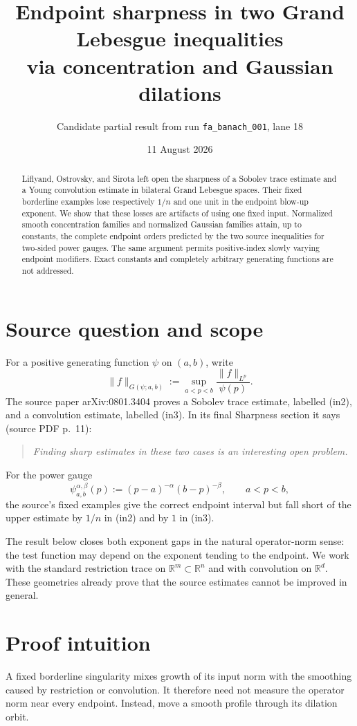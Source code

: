 \documentclass[11pt]{article}
\title{Endpoint sharpness in two Grand Lebesgue inequalities\\
via concentration and Gaussian dilations}
\author{Candidate partial result from run \texttt{fa\_banach\_001}, lane 18}
\date{11 August 2026}
\newcommand{\R}{\mathbb R}
\newcommand{\norm}[1]{\lVert#1\rVert}
\begin{document}
\maketitle
\begin{abstract}
Liflyand, Ostrovsky, and Sirota left open the sharpness of a Sobolev
trace estimate and a Young convolution estimate in bilateral Grand Lebesgue
spaces. Their fixed borderline examples lose respectively $1/n$ and one unit
in the endpoint blow-up exponent. We show that these losses are artifacts of
using one fixed input. Normalized smooth concentration families and normalized
Gaussian families attain, up to constants, the complete endpoint orders
predicted by the two source inequalities for two-sided power gauges. The same
argument permits positive-index slowly varying endpoint modifiers. Exact
constants and completely arbitrary generating functions are not addressed.
\end{abstract}

\section{Source question and scope}
For a positive generating function $\psi$ on $(a,b)$, write
\[
 \norm{f}_{G(\psi;a,b)}
 :=\sup_{a<p<b}\frac{\norm{f}_{L^p}}{\psi(p)}.
\]
The source paper arXiv:0801.3404 proves a Sobolev trace estimate, labelled
(in2), and a convolution estimate, labelled (in3). In its final Sharpness
section it says (source PDF p.~11):
\begin{quote}
\emph{Finding sharp estimates in these two cases is an interesting open problem.}
\end{quote}
For the power gauge
\[
 \psi_{a,b}^{\alpha,\beta}(p)
 :=(p-a)^{-\alpha}(b-p)^{-\beta},\qquad a<p<b,
 \tag{1}
\]
the source's fixed examples give the correct endpoint interval but fall short
of the upper estimate by $1/n$ in (in2) and by $1$ in (in3).

The result below closes both exponent gaps in the natural operator-norm sense:
the test function may depend on the exponent tending to the endpoint. We work
with the standard restriction trace on $\R^m\subset\R^n$ and with convolution
on $\R^d$. These geometries already prove that the source estimates cannot be
improved in general.

\section{Proof intuition}
A fixed borderline singularity mixes growth of its input norm with the
smoothing caused by restriction or convolution. It therefore need not measure
the operator norm near every endpoint. Instead, move a smooth profile through
its dilation orbit.
\end{document}
